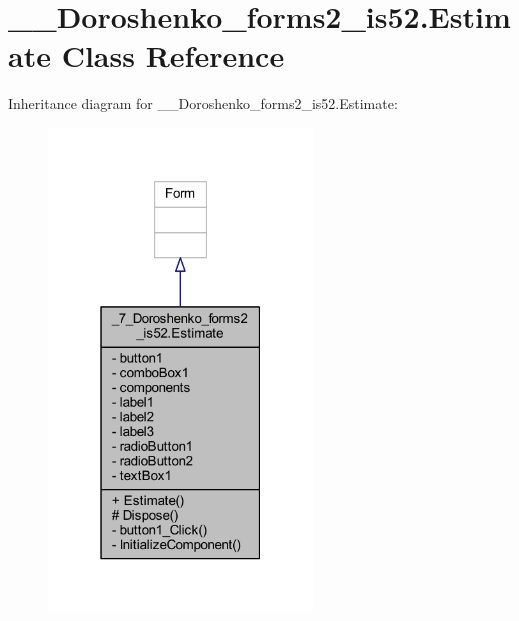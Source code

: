 \hypertarget{class__7___doroshenko__forms2__is52_1_1_estimate}{}\section{\+\_\+\_\+\+Doroshenko\+\_\+forms2\+\_\+is52.\+Estimate Class Reference}
\label{class__7___doroshenko__forms2__is52_1_1_estimate}


Inheritance diagram for \+\_\+\_\+\+Doroshenko\+\_\+forms2\+\_\+is52.\+Estimate\+:
\nopagebreak
\begin{figure}[H]
\begin{center}
\leavevmode
\includegraphics[width=199pt]{class__7___doroshenko__forms2__is52_1_1_estimate__inherit__graph}
\end{center}
\end{figure}


